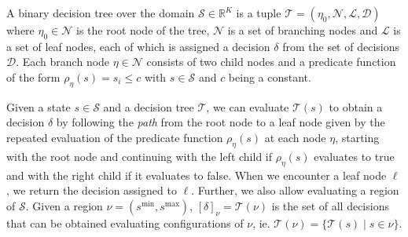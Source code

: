 \begin{definition}%
\label{def:decisionTree}
    A binary decision tree over the domain $\mathcal{S} \in \mathbb{R}^K$ is a
    tuple $\mathcal{T} = (\eta_{0}, \mathcal{N}, \mathcal{L}, \mathcal{D})$
    where $\eta_{0} \in \mathcal{N}$ is the root node of the tree, $\mathcal{N}$
    is a set of branching nodes and $\mathcal{L}$ is a set of leaf nodes, each
    of which is assigned a decision $\delta$ from the set of decisions
    $\mathcal{D}$. Each branch node $\eta \in \mathcal{N}$ consists of two child
    nodes and a predicate function of the form $\rho_{\eta}(s) = s_{i} \leq c$ with $s
    \in \mathcal{S}$ and $c$ being a constant.
\end{definition}

\noindent
Given a state $s \in \mathcal{S}$ and a decision tree $\mathcal{T}$, we can
evaluate $\mathcal{T}(s)$ to obtain a decision $\delta$ by following the
\textit{path} from the root node to a leaf node given by the repeated evaluation
of the predicate function $\rho_{\eta}(s)$ at each node $\eta$, starting with
the root node and continuing with the left child if $\rho_{\eta}(s)$ evaluates
to true and with the right child if it evaluates to false. When we encounter a
leaf node $\ell$, we return the decision assigned to $\ell$. Further, we also
allow evaluating a region of $\mathcal{S}$.  Given a region $\nu = (s^{\min},
s^{\max})$, $[\delta]_{\nu} = \mathcal{T}(\nu)$ is the set of all decisions that
can be obtained evaluating configurations of $\nu$, ie. $\mathcal{T}(\nu) = \{
\mathcal{T}(s) \mid s \in \nu \}$.


